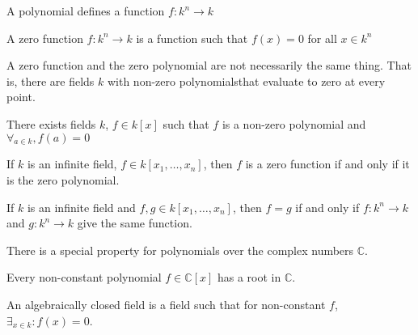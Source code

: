 \documentclass[crop=false,class=book,oneside]{standalone}
\begin{document}
                \begin{remark}
                    A polynomial defines a function
                    $f:k^{n}\rightarrow{k}$
                \end{remark}
                \begin{definition}
                    A zero function $f:k^{n}\rightarrow{k}$
                    is a function such that $f(x)=0$
                    for all $x\in{k^{n}}$
                \end{definition}
                \begin{remark}
                    A zero function and the zero polynomial are
                    not necessarily the same thing. That is,
                    there are fields $k$ with non-zero
                    polynomialsthat evaluate to
                    zero at every point.
                \end{remark}
                \begin{theorem}
                    There exists fields $k$, $f\in k[x]$ such
                    that $f$ is a non-zero polynomial and
                    $\forall_{a\in k},f(a)=0$
                \end{theorem}
                \begin{theorem}
                    If $k$ is an infinite field,
                    $f\in k[x_1,\hdots ,x_n]$, then $f$ is a
                    zero function if and only if it is
                    the zero polynomial.
                \end{theorem}
                \begin{theorem}
                    If $k$ is an infinite field and
                    $f,g\in k[x_1,\hdots,x_n]$, then $f=g$ if and
                    only if $f:k^n\rightarrow k$ and
                    $g:k^n \rightarrow k$ give
                    the same function.
                \end{theorem}
                There is a special property for polynomials
                over the complex numbers $\mathbb{C}$.
                \begin{theorem}
                    Every non-constant polynomial
                    $f\in\mathbb{C}[x]$ has a root in $\mathbb{C}$.
                \end{theorem}
                \begin{definition}
                    An algebraically closed field is a field
                    such that for non-constant $f$,
                    $\exists_{x\in k}:f(x)=0$.
                \end{definition}
\end{document}
